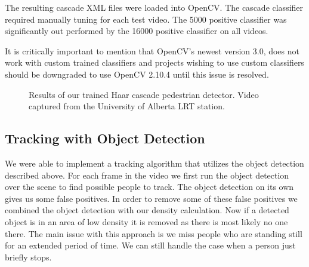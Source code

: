 \documentclass[12pt, onecolumn, conference]{IEEEtran}
\begin{document}
The resulting cascade XML files were loaded into OpenCV. The cascade classifier required manually tuning for each test video. The 5000 positive classifier was significantly out performed by the 16000 positive classifier on all videos. 

It is critically important to mention that OpenCV's newest version 3.0, does not work with custom trained classifiers and projects wishing to use custom classifiers should be downgraded to use OpenCV 2.10.4 until this issue is resolved.

\begin{figure}[!t]
\centering
{}
\hfil
{}
\caption{Results of our trained Haar cascade pedestrian detector. Video captured from the University of Alberta LRT station.}
\label{Object_Detection}
\end{figure}

\subsection{Tracking with Object Detection}

We were able to implement a tracking algorithm that utilizes the object detection described above. For each frame in the video we first run the object detection over the scene to find possible people to track. The object detection on its own gives us some false positives. In order to remove some of these false positives we combined the object detection with our density calculation. Now if a detected object is in an area of low density it is removed as there is most likely no one there. The main issue with this approach is we miss people who are standing still for an extended period of time. We can still handle the case when a person just briefly stops.
\end{document}
